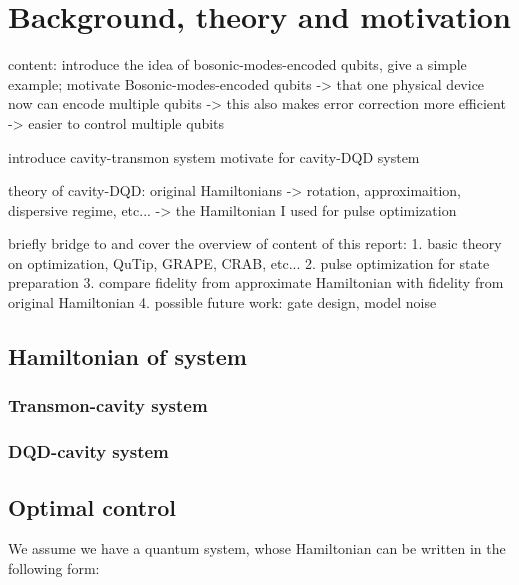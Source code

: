 \documentclass{article}
\begin{document}
\section{Background, theory and motivation}
content: 
introduce the idea of bosonic-modes-encoded qubits, give a simple example;
motivate Bosonic-modes-encoded qubits 
    -> that one physical device now can encode multiple qubits
    -> this also makes error correction more efficient -> easier to control multiple qubits

introduce cavity-transmon system 
motivate for cavity-DQD system

theory of cavity-DQD: 
original Hamiltonians -> rotation, approximaition, dispersive regime, etc... -> the Hamiltonian I used for pulse optimization

briefly bridge to and cover the overview of content of this report: 
1. basic theory on optimization, QuTip, GRAPE, CRAB, etc...
2. pulse optimization for state preparation
3. compare fidelity from approximate Hamiltonian with fidelity from original Hamiltonian 
4. possible future work: gate design, model noise


\subsection{Hamiltonian of system}

\subsubsection{Transmon-cavity system}

\subsubsection{DQD-cavity system}

\subsection{Optimal control}
We assume we have a quantum system, whose Hamiltonian can be written in the following form: 
\end{document}
